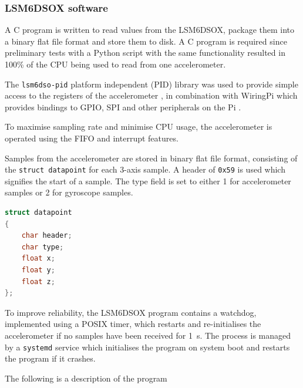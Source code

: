 \documentclass[]{report}
\begin{document}
\subsubsection{LSM6\-DSOX software} A C program is written to read values from the LSM6\-DSOX, package them into a binary flat file format and store them to disk. A C program is required since preliminary tests with a Python script with the same functionality resulted in 100\% of the CPU being used to read from one accelerometer.

The \texttt{lsm6dso-pid} platform independent (PID) library was used to provide simple access to the registers of the accelerometer \cite{stmicroelectronics_lsm6dsox_pid}, in combination with WiringPi which provides bindings to GPIO, SPI and other peripherals on the Pi \cite{wiringpi-github}.

To maximise sampling rate and minimise CPU usage, the accelerometer is operated using the FIFO and interrupt features.

Samples from the accelerometer are stored in binary flat file format, consisting of the \texttt{struct datapoint} for each 3-axis sample. A header of \texttt{0x59} is used which signifies the start of a sample. The type field is set to either 1 for accelerometer samples or 2 for gyroscope samples.

\begin{lstlisting}[language=C]
struct datapoint
{
    char header;
    char type;
    float x;
    float y;
    float z;
};
\end{lstlisting}

To improve reliability, the LSM6\-DSOX program contains a watchdog, implemented using a POSIX timer, which restarts and re-initialises the accelerometer if no samples have been received for \SI{1}{\second}. The process is managed by a \texttt{systemd} service which initialises the program on system boot and restarts the program if it crashes.

The following is a description of the program
\end{document}
